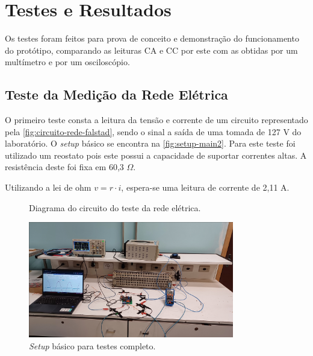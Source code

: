 
\chapter{Testes e Resultados}\label{cap:resultados}

Os testes foram feitos para prova de conceito e demonstração do funcionamento do protótipo, comparando as leituras \gls{CA} e \gls{CC} por este com as obtidas por um multímetro e por um osciloscópio.

\section{Teste da Medição da Rede Elétrica}\label{sec:l-rede}

O primeiro teste consta a leitura da tensão e corrente de um circuito representado pela \autoref{fig:circuito-rede-falstad}, sendo o sinal a saída de uma tomada de 127 V do laboratório. O \textit{setup} básico se encontra na \autoref{fig:setup-main2}. Para este teste foi utilizado um reostato pois este possui a capacidade de suportar correntes altas. A resistência deste foi fixa em 60,3 $\Omega$.

Utilizando a lei de ohm $v = r \cdot  i$, espera-se uma leitura de corrente de 2,11 A.

\begin{figure}[htb!]
    \caption{Diagrama do circuito do teste da rede elétrica.}
    \vspace*{5mm}
    \label{fig:circuito-rede-falstad}
    \fonte{}
\end{figure}

\begin{figure}[htb!]
    \caption{\textit{Setup} básico para testes completo.}
    \vspace*{5mm}
    \label{fig:setup-main2}
    \includegraphics[width=0.8\textwidth]{figuras/setup-basico-full.png}
    \fonte{}
\end{figure}

